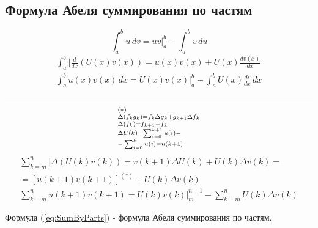 \documentclass[a4paper,11pt]{article}
\begin{document}
  \subsection {Формула Абеля суммирования по частям}
  \[\int_{a}^{b} u\,dv = uv \bigg|_{a}^{b} - \int_{a}^{b} v\,du\]
  \begin{equation}
    \begin{split}
      \int_{a}^{b} \bigg| \frac{d}{dx}(U(x)v(x)) = u(x)v(x) + U(x)\frac{dv(x)}{dx} \\
      \int_{a}^{b} u(x)v(x)\,dx = U(x)v(x) \bigg|_{a}^{b} - \int_{a}^{b} U(x)\frac{dv}{dx} \,dx
    \end{split}
  \end{equation}
  \hrule
  \marginpar
  {
    \begin{gather*}
      \begin{subarray}{1}
        (*) \\
        \Delta (f_k g_k) = f_k \Delta g_k + g_{k+1} \Delta f_k \\
        \Delta (f_k) = f_{k+1} - f_k \\
        \Delta U(k) = \sum_{i=0}^{k+1} u(i) - \\
        - \sum_{i=0}^{k} u(i) = u(k+1)
      \end{subarray}
    \end{gather*}
  }
  \begin{equation}
    \begin{split}
      \sum_{k=m}^{n} \bigg| \Delta(U(k) v(k)) = v(k+1) \Delta U(k) + U(k) \Delta v(k) = \\
      = [ u(k+1) v(k+1) ]^{(*)} + U(k) \Delta v(k) \\
      \sum_{k=m}^{n} u(k+1) v(k+1) = U(k) v(k) \bigg|_{m}^{n+1} - \sum_{k=m}^{n} U(k) \Delta v(k)
    \end{split}
    \label{eq:SumByParts}
  \end{equation}

  Формула (\ref{eq:SumByParts}) - формула Абеля суммирования по частям. \\
\end{document}
